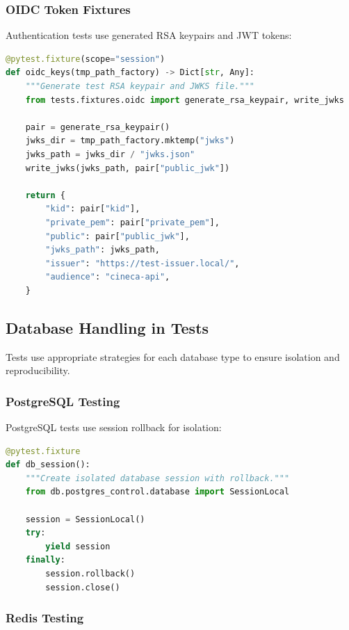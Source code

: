 \subsubsection{OIDC Token Fixtures}

Authentication tests use generated RSA keypairs and JWT tokens:

\begin{lstlisting}[language=Python, caption={OIDC fixtures for authentication testing.}]
@pytest.fixture(scope="session")
def oidc_keys(tmp_path_factory) -> Dict[str, Any]:
    """Generate test RSA keypair and JWKS file."""
    from tests.fixtures.oidc import generate_rsa_keypair, write_jwks
    
    pair = generate_rsa_keypair()
    jwks_dir = tmp_path_factory.mktemp("jwks")
    jwks_path = jwks_dir / "jwks.json"
    write_jwks(jwks_path, pair["public_jwk"])
    
    return {
        "kid": pair["kid"],
        "private_pem": pair["private_pem"],
        "public": pair["public_jwk"],
        "jwks_path": jwks_path,
        "issuer": "https://test-issuer.local/",
        "audience": "cineca-api",
    }
\end{lstlisting}

\subsection{Database Handling in Tests}

Tests use appropriate strategies for each database type to ensure isolation and reproducibility.

\subsubsection{PostgreSQL Testing}

PostgreSQL tests use session rollback for isolation:

\begin{lstlisting}[language=Python, caption={PostgreSQL test session fixture.}]
@pytest.fixture
def db_session():
    """Create isolated database session with rollback."""
    from db.postgres_control.database import SessionLocal
    
    session = SessionLocal()
    try:
        yield session
    finally:
        session.rollback()
        session.close()
\end{lstlisting}

\subsubsection{Redis Testing}

